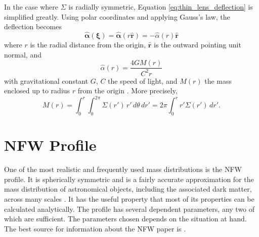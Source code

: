 \documentclass[10pt,twoside]{article}
\theoremstyle{definition}
\theoremstyle{exercise}
\renewcommand{\v}[1]{\boldsymbol{#1}}%
\begin{document}
In the case where $\Sigma$ is radially symmetric, Equation \eqref{eq:thin_lens_deflection} is simplified greatly. Using polar coordinates and applying Gauss's law, the deflection becomes
\begin{equation}
		\hat{\v{\alpha}}(\v{\xi}) =	\hat{\v{\alpha}}(r \hat{\v{r}}) = -\hat{\alpha}(r) \hat{\v{r}}
		\label{eq:radially_symmetric}
\end{equation}
where $r$ is the radial distance from the origin, $\hat{\v{r}}$ is the outward pointing unit normal, and 
\begin{equation}
		\hat{\alpha}(r) = \frac{4G M(r)}{C^2 r}
		\label{eq:radial_deflection}
\end{equation}
with gravitational constant $G$, $C$ the speed of light, and $M(r)$ the mass enclosed up to radius $r$ from the origin \cite{Narayan:1996ba}. More precisely,
\begin{equation}
		M(r) = \int_0^r \int_0^{2\pi} \Sigma(r') \, r' \, d\theta \, dr' = 2\pi \int_0^r r' \Sigma(r') \, dr'.
		\label{eq:mass_enclosed}
\end{equation}

\section{NFW Profile}

One of the most realistic and frequently used mass distributions is the NFW profile. It is spherically symmetric and is a fairly accurate approximation for the mass distribution of astronomical objects, including the associated dark matter, across many scales \cite{Navarro:1995iw}. It has the useful property that most of its properties can be calculated analytically. The profile has several dependent parameters, any two of which are sufficient. The parameters chosen depends on the situation at hand. The best source for information about the NFW paper is \cite{brainerd_wright}.
\end{document}
